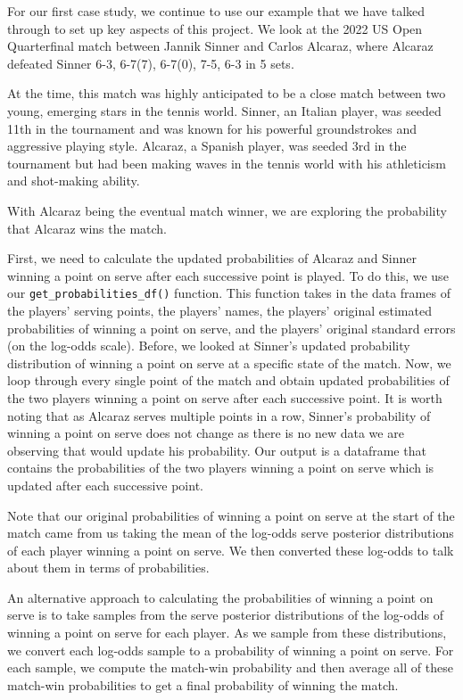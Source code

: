 \documentclass[
  letterpaper,
  DIV=11,
  numbers=noendperiod]{scrartcl}
\begin{document}
For our first case study, we continue to use our example that we have
talked through to set up key aspects of this project. We look at the
2022 US Open Quarterfinal match between Jannik Sinner and Carlos
Alcaraz, where Alcaraz defeated Sinner 6-3, 6-7(7), 6-7(0), 7-5, 6-3 in
5 sets.

At the time, this match was highly anticipated to be a close match
between two young, emerging stars in the tennis world. Sinner, an
Italian player, was seeded 11th in the tournament and was known for his
powerful groundstrokes and aggressive playing style. Alcaraz, a Spanish
player, was seeded 3rd in the tournament but had been making waves in
the tennis world with his athleticism and shot-making ability.

With Alcaraz being the eventual match winner, we are exploring the
probability that Alcaraz wins the match.

First, we need to calculate the updated probabilities of Alcaraz and
Sinner winning a point on serve after each successive point is played.
To do this, we use our \texttt{get\_probabilities\_df()} function. This
function takes in the data frames of the players' serving points, the
players' names, the players' original estimated probabilities of winning
a point on serve, and the players' original standard errors (on the
log-odds scale). Before, we looked at Sinner's updated probability
distribution of winning a point on serve at a specific state of the
match. Now, we loop through every single point of the match and obtain
updated probabilities of the two players winning a point on serve after
each successive point. It is worth noting that as Alcaraz serves
multiple points in a row, Sinner's probability of winning a point on
serve does not change as there is no new data we are observing that
would update his probability. Our output is a dataframe that contains
the probabilities of the two players winning a point on serve which is
updated after each successive point.

Note that our original probabilities of winning a point on serve at the
start of the match came from us taking the mean of the log-odds serve
posterior distributions of each player winning a point on serve. We then
converted these log-odds to talk about them in terms of probabilities.

An alternative approach to calculating the probabilities of winning a
point on serve is to take samples from the serve posterior distributions
of the log-odds of winning a point on serve for each player. As we
sample from these distributions, we convert each log-odds sample to a
probability of winning a point on serve. For each sample, we compute the
match-win probability and then average all of these match-win
probabilities to get a final probability of winning the match.
\end{document}
